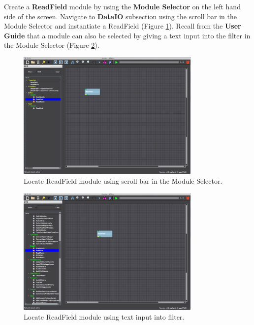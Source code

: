 \documentclass[fleqn,11pt,openany]{book}
\begin{document}
Create a \textbf{ReadField} module by using the \textbf{Module Selector} on the left hand side of the screen. Navigate to \textbf{DataIO} subsection using the scroll bar in the Module Selector and instantiate a ReadField (Figure \ref{fig:readfield}). Recall from the \textbf{User Guide} that a module can also be selected by giving a text input into the filter in the Module Selector (Figure \ref{fig:readfield2}). 

\begin{figure}[H]
\begin{center}
\includegraphics[width=0.8\textwidth]{BasicTutorial_figures/readfield_text.png}
\caption{Locate ReadField module using scroll bar in the Module Selector.}
\label{fig:readfield}
\end{center}
\end{figure}

\begin{figure}[H]
\center
\includegraphics[width=0.8\textwidth]{BasicTutorial_figures/readfield.png}
\caption{Locate ReadField module using text input into filter.}
\label{fig:readfield2}
\end{figure}
\end{document}
